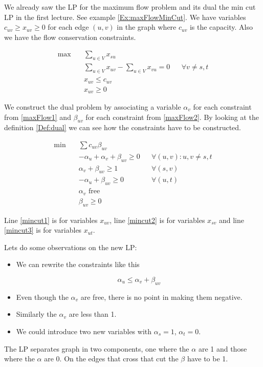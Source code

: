 \begin{Ex} We already saw the LP for the maximum flow problem and its dual the min cut LP in the first lecture. See example \ref{Ex:maxFlowMinCut}. We have variables $c_{uv} \geq x_{uv}\geq 0$ for each edge $(u,v)$ in the graph where  $c_{uv}$ is the capacity. Also we have the flow conservation constraints.

\begin{align}
\max \quad & \sum_{u\in V} x_{su}\\
&\sum_{u\in V} x_{uv} - \sum_{u\in V} x_{vu} = 0 && \forall v \neq s,t \label{maxFlow1}\\
&x_{uv} \leq c_{uv}\label{maxFlow2}\\
&x_{uv} \geq 0
\end{align}

We construct the dual problem by associating a variable $\alpha_v$ for each constraint from \ref{maxFlow1} and $\beta_{uv}$ for each constraint from \ref{maxFlow2}. By looking at the definition \ref{Def:dual} we can see how the constraints have to be constructed.

\begin{align}
\min \quad & \sum c_{uv}\beta_{uv}\\
 & -\alpha_u + \alpha_v  + \beta_{uv} \geq 0 && \forall (u,v): u,v\neq s,t\label{mincut1}\\
 & \alpha_v + \beta_{uv} \geq 1 && \forall (s,v)\label{mincut2}\\
 & -\alpha_u + \beta_{uv} \geq 0 && \forall(u,t)\label{mincut3}\\
 & \alpha_v \text{ free}\\
 & \beta_{uv} \geq 0
\end{align}

Line \ref{mincut1} is for variables $x_{uv}$, line \ref{mincut2} is for variables $x_{sv}$ and line \ref{mincut3} is for variables $x_{ut}$. 

Lets do some observations on the new LP: 

\begin{itemize}
\item We can rewrite the constraints like this

\[\alpha_u \leq \alpha_v + \beta_{uv}\]

\item Even though the $\alpha_v$ are free, there is no point in making them negative. 
\item Similarly the $\alpha_v$ are less than 1.
\item We could introduce two new variables with $\alpha_s=1$, $\alpha_t=0$.
\end{itemize}

The LP separates graph in two components, one where the $\alpha$ are 1 and those where the $\alpha$ are 0. On the edges that cross that cut the $\beta$ have to be 1. %
\end{Ex}